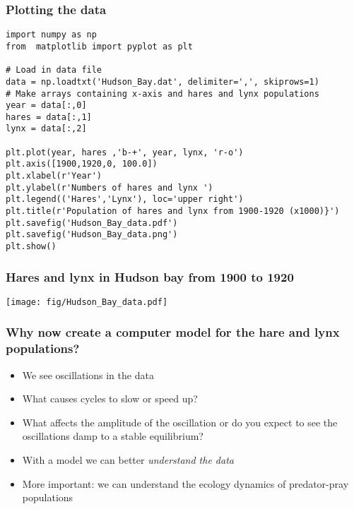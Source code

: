 \documentclass{beamer}
\begin{document}
\begin{frame}
\frametitle{Plotting the data}

\begin{block}{}
\begin{verbatim}
import numpy as np
from  matplotlib import pyplot as plt

# Load in data file
data = np.loadtxt('Hudson_Bay.dat', delimiter=',', skiprows=1)
# Make arrays containing x-axis and hares and lynx populations
year = data[:,0]
hares = data[:,1]
lynx = data[:,2]

plt.plot(year, hares ,'b-+', year, lynx, 'r-o')
plt.axis([1900,1920,0, 100.0])
plt.xlabel(r'Year')
plt.ylabel(r'Numbers of hares and lynx ')
plt.legend(('Hares','Lynx'), loc='upper right')
plt.title(r'Population of hares and lynx from 1900-1920 (x1000)}')
plt.savefig('Hudson_Bay_data.pdf')
plt.savefig('Hudson_Bay_data.png')
plt.show()
\end{verbatim}
\end{block}
\end{frame}

\begin{frame}
\frametitle{Hares and lynx in Hudson bay from 1900 to 1920}

\centerline{\texttt{[image: fig/Hudson\_Bay\_data.pdf]}}
\end{frame}

\begin{frame}
\frametitle{Why now create a computer model for the hare and lynx populations?}

\begin{block}{}
\begin{itemize}
 \item We see oscillations in the data

 \item What causes cycles to slow or speed up?

 \item What affects the amplitude of the oscillation or do you expect to see the oscillations damp to a stable equilibrium?

 \item With a model we can better \emph{understand the data}

 \item More important: we can understand the ecology dynamics of
   predator-pray populations
\end{itemize}

\noindent
\end{block}
\end{frame}
\end{document}
